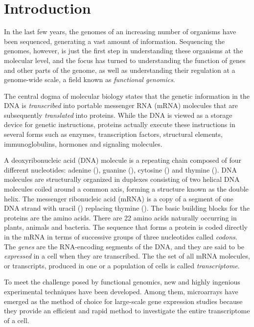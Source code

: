 \chapter{Introduction}
\label{ch:intro}

In the last few years, the genomes of an increasing number of organisms have
been sequenced, generating a vast amount of information. Sequencing the genomes,
however, is just the first step in understanding these organisms at the
molecular level, and the focus has turned to understanding the function of genes
and other parts of the genome, as well as understanding their regulation at a
genome-wide scale, a field known as \emph{functional genomics}.

The central dogma of molecular biology states that the genetic information in
the DNA is \emph{transcribed} into portable messenger RNA (mRNA) molecules that
are subsequently \emph{translated} into proteins. While the DNA is viewed as a
storage device for genetic instructions, proteins actually execute these
instructions in several forms such as enzymes, transcription factors, structural
elements, immunoglobulins, hormones and signaling molecules.

A deoxyribonucleic acid (DNA) molecule is a repeating chain composed of four
different nucleotides: adenine (\tA), guanine (\tG), cytosine (\tC) and thymine
(\tT). DNA molecules are structurally organized in duplexes consisting of two
helical DNA molecules coiled around a common axis, forming a structure known as
the double helix. The messenger ribonucleic acid (mRNA) is a copy of a segment
of one DNA strand with uracil (\tU) replacing thymine (\tT). The basic building
blocks for the proteins are the amino acids. There are 22 amino acids naturally
occurring in plants, animals and bacteria. The sequence that forms a protein is
coded directly in the mRNA in terms of successive groups of three nucleotides
called \emph{codons}. The \emph{genes} are the RNA-encoding segments of the DNA,
and they are said to be \emph{expressed} in a cell when they are transcribed.
The the set of all mRNA molecules, or transcripts, produced in one or a
population of cells is called \emph{transcriptome}.

To meet the challenge posed by functional genomics, new and highly ingenious
experimental techniques have been developed. Among them, microarrays have
emerged as the method of choice for large-scale gene expression studies because
they provide an efficient and rapid method to investigate the entire
transcriptome of a cell.

